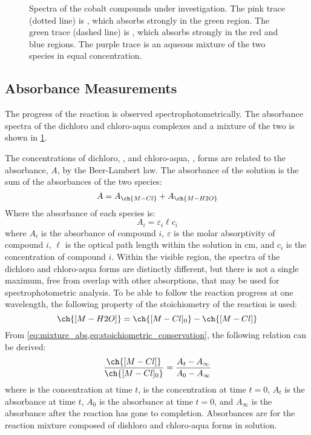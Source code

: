 \begin{figure}[htb]
	
	\caption{Spectra of the cobalt compounds under investigation. The pink trace (dotted line) is , which absorbs strongly in the green region. The green trace (dashed line) is , which absorbs strongly in the red and blue regions. The purple trace is an aqueous mixture of the two species in equal concentration.}
	\label{fig:co_spectra}
\end{figure}	

\subsection{Absorbance Measurements}
\label{subs:absorbance_measurements}

The progress of the reaction is observed spectrophotometrically. The absorbance spectra of the dichloro and chloro-aqua complexes and a mixture of the two is shown in \cref{fig:co_spectra}. 

The concentrations of dichloro, \ch{[M-Cl]}, and chloro-aqua, \ch{[M-H2O]}, forms are related to the absorbance, \(A\), by the Beer-Lambert law. The absorbance of the solution is the sum of the absorbances of the two species: 
\begin{equation}
	A = A_{\ch{M-Cl}} + A_{\ch{M-H2O}}
	\label{eq:mixture_abs}
\end{equation}
Where the absorbance of each species is:
\begin{equation}
	A_{i} = \varepsilon_{i} \ell c_{i}
	\label{eq:beer-lambert_law}
\end{equation}
where \(A_{i}\) is the absorbance of compound \(i\), \(\varepsilon\) is the molar absorptivity of compound \(i\), \(\ell\) is the optical path length within the solution in \unit{\cm},  and \(c_{i}\) is the concentration of compound \(i\). 
Within the visible region, the spectra of the dichloro and chloro-aqua forms are distinctly different, but there is not a single maximum, free from overlap with other absorptions, that may be used for spectrophotometric analysis. 
To be able to follow the reaction progress at one wavelength, the following property of the stoichiometry of the reaction is used:
\begin{equation}
	\ch{[M-H2O]} = \ch{[M-Cl]_0} - \ch{[M-Cl]}
	\label{eq:stoichiometric_conservation}
\end{equation}
From \cref{eq:mixture_abs,eq:stoichiometric_conservation}, the following relation can be derived:
\begin{equation}
	\frac{\ch{[M-Cl]}}{\ch{[M-Cl]_0}} = \frac{A_t - A_\infty}{A_0 - A_\infty}
	\label{eq:conversion_fraction}
\end{equation}
where \ch{[M-Cl]} is the concentration at time \(t\),  is the concentration at time \(t=0\), \(A_t\) is the absorbance at time \(t\), \(A_0\) is the absorbance at time \(t=0\), and \(A_\infty\) is the absorbance after the reaction has gone to completion. 
Absorbances are for the reaction mixture composed of dishloro and chloro-aqua forms in solution. 

